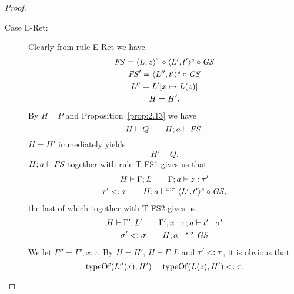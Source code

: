 \begin{proof}
\begin{description}
\begin{description}
        \item[Case {\sc E-Ret}:] Clearly from rule {\sc E-Ret} we have
          \begin{equation}
            \begin{gathered}
              \mathit{FS} = \mbox{$\langle L, z \rangle$}^x \circ \mbox{$\langle L', t' \rangle^s$} \circ \mathit{GS} \\
              \mathit{FS}' = \mbox{$\langle L'', t' \rangle^s$} \circ \mathit{GS} \\
              L'' = L'[x \mapsto L(z)] \\
              H = H'.
            \end{gathered}
          \end{equation}
          By $H \vdash P$ and Proposition~\ref{prop:2.13} we have
          \begin{equation} \label{eq:eret-hp0}
            H \vdash Q \quad\quad H; a \vdash \mathit{FS}.
          \end{equation}
          $H = H'$ immediately yields
          \begin{equation}
            H' \vdash Q.
          \end{equation}
          $H; a \vdash \mathit{FS}$ together with rule {\sc T-FS1} gives us that
          \begin{equation}
            \begin{gathered}
              H \vdash \Gamma; L \quad\quad \mbox{$\Gamma;a\vdash z:\tau'$} \\
              \tau' <: \tau \quad\quad H; a \vdash^{x: \tau} \mbox{$\langle L', t' \rangle^s$} \circ \mathit{GS},
            \end{gathered}
          \end{equation}
          the last of which together with {\sc T-FS2} gives us
          \begin{equation} \label{eq:eret-hp1}
            \begin{gathered}
              H \vdash \Gamma'; L' \quad\quad \mbox{$\Gamma', x:
              \tau;a\vdash t':\sigma'$} \\
              \sigma' <: \sigma \quad\quad H; a \vdash^{s: \sigma} \mathit{GS}
            \end{gathered}
          \end{equation}
          We let $\Gamma'' = \Gamma', x : \tau$. By $H = H'$, $H \vdash \Gamma;
          L$ and $\tau' <: \tau$, it is obvious that
          \begin{equation} \label{eq:eret-hp3}
            \mbox{$\mathrm{typeOf}$}(L''(x), H') = \mbox{$\mathrm{typeOf}$}(L(z), H') <: \tau.
          \end{equation}

\end{description}
\end{description}
\end{proof}
